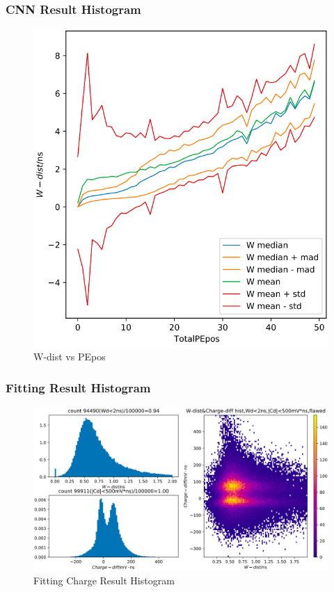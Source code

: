\documentclass{beamer}
\begin{document}
\begin{frame}
\frametitle{CNN Result Histogram}
\setlength{\abovecaptionskip}{0mm}
\setlength{\belowcaptionskip}{0mm}
\begin{figure}
    \centering
    \caption{W-dist vs PEpos}
    \includegraphics[width=0.9\linewidth]{img/takarastats.png}
\end{figure}
\end{frame}

\begin{frame}
\frametitle{Fitting Result Histogram}
\begin{figure}
    \centering
    \caption{Fitting Charge Result Histogram}
    \includegraphics[width=1.0\linewidth]{img/xiaopeiphist.png}
\end{figure}
\end{frame}
\end{document}
